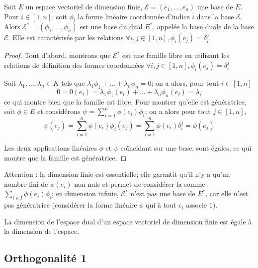 \begin{de}
Soit $E$ un espace vectoriel de dimension finie, $\mathcal{E} = (e_1,\ldots,e_n)$ une base de $E$. Pour $i \in [1,n]$, soit $\phi_i$ la forme linéaire coordonnée d'indice $i$ dans la base $\mathcal{E}$. Alors $\mathcal{E}^* = (\phi_1,\ldots,\phi_n)$ est une base du dual $E^*$, appelée la base duale de la base $\mathcal{E}$. Elle est caractérisée par les relations $\forall i,j \in [1,n], \phi_i(e_j) = \delta_i^j$.
\end{de}

\begin{proof}
Tout d'abord, montrons que $\mathcal{E}^*$ est une famille libre en utilisant les relations de définition des formes coordonnées $\forall i,j \in [1,n], \phi_i(e_j) = \delta_i^j$

Soit $\lambda_1,\ldots,\lambda_n \in K$ tels que $\lambda_1\phi_1 + \ldots + \lambda_n\phi_n = 0$; on a alors, pour tout $i \in [1,n]$
\[ 0 = 0(e_i) = \lambda_1\phi_1(e_i) + \ldots + \lambda_n\phi_n(e_i) = \lambda_i \]
ce qui montre bien que la famille est libre. Pour montrer qu'elle est génératrice, soit $\phi \in E$ et considérons $\psi = \sum_{i=1}^n \phi(e_i)\phi_i$; on a alors pour tout $j \in [1,n]$,
\[ \psi(e_j) = \sum_{i=1}^n \phi(e_i)\phi_i(e_j) = \sum_{i=1}^n \phi(e_i)\delta_i^j = \phi(e_j) \]

Les deux applications linéaires $\phi$ et $\psi$ coïncidant sur une base, sont égales, ce qui montre que la famille est génératrice.
\end{proof}

\begin{rem}
Attention : la dimension finie est essentielle; elle garantit qu'il n'y a qu'un nombre fini de $\phi(e_i)$ non nuls et permet de considérer la somme $\sum_{i\in I} \phi(e_i)\phi_i$; en dimension infinie, $\mathcal{E}^*$ n'est pas une base de $E^*$, car elle n'est pas génératrice (considérer la forme linéaire $\phi$ qui à tout $e_i$ associe $1$).
\end{rem}

\begin{cor}
La dimension de l'espace dual d'un espace vectoriel de dimension finie est égale à la dimension de l'espace.
\end{cor}

\subsection{Orthogonalité 1}

